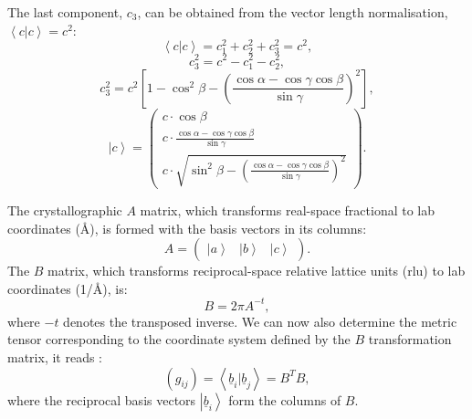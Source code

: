 The last component, $c_3$, can be obtained from the vector length normalisation, $ \left< c | c \right> = c^2 $:
\begin{equation} \left< c | c \right > = c_1^2 + c_2^2 + c_3^2 = c^2, \end{equation}
\begin{equation} c_3^2 = c^2 - c_1^2 - c_2^2, \end{equation}
\begin{equation} 
	c_3^2 = c^2 \left[1 - \cos^2 \beta - \left(\frac{\cos \alpha - \cos \gamma \cos \beta}{\sin \gamma} \right)^2 \right], 
\end{equation}
\begin{equation} \boxed{ \left| c \right> = \left( \begin{array}{c}
	c \cdot \cos \beta \\
	c \cdot \frac{\cos \alpha - \cos \gamma \cos \beta}{\sin \gamma} \\
	c \cdot \sqrt{ \sin^2 \beta - \left(\frac{\cos \alpha - \cos \gamma \cos \beta}{\sin \gamma} \right)^2 }
\end{array} \right). } \end{equation}



The crystallographic $A$ matrix, which transforms real-space fractional to lab coordinates (\AA), is formed with the basis vectors in its columns:
\begin{equation}
	A = \left(
		\begin{array}{ccc}
			\left| a \right> & \left| b \right> & \left| c \right>
		\end{array}
	\right).
\end{equation}
The $B$ matrix, which transforms reciprocal-space relative lattice units (rlu) to lab coordinates (1/\AA), is:
\begin{equation} B = 2 \pi A^{-t}, \end{equation}
where $-t$ denotes the transposed inverse.
We can now also determine the metric tensor corresponding to the coordinate system defined by the $B$ transformation matrix, it reads \cite[p. 808]{Arens2015}:
\begin{equation}
	\left(g_{ij}\right) = \left<\underline{b}_i | \underline{b}_j \right> = B^T B,
\end{equation}
where the reciprocal basis vectors $\left| \underline{b}_i \right>$ form the columns of $B$.


